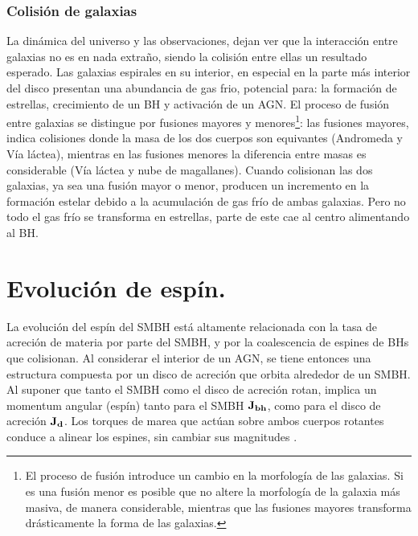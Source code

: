     \subsubsection{Colisión de galaxias}
    \label{subsubsec: mergers_galaxys}
La dinámica del universo y las observaciones, dejan ver que la interacción entre galaxias no es en nada extraño, siendo la colisión entre ellas un resultado esperado. Las galaxias espirales en su interior, en especial en la parte más interior del disco presentan una abundancia de gas frio, potencial para: la formación de estrellas, crecimiento de un BH y activación de un AGN. El proceso de fusión entre galaxias se distingue por fusiones mayores y menores\footnote{El proceso de fusión introduce un cambio en la morfología de las galaxias. Si es una fusión menor es posible que no altere la morfología de la galaxia más masiva, de manera considerable, mientras que las fusiones mayores transforma drásticamente la forma de las galaxias. }: las fusiones mayores, indica colisiones donde la masa de los dos cuerpos son equivantes (Andromeda y Vía láctea), mientras en las fusiones menores la diferencia entre masas es considerable (Vía láctea y nube de magallanes). Cuando colisionan las dos galaxias, ya sea una fusión mayor o menor, producen un incremento en la formación estelar debido a la acumulación de gas frío de ambas galaxias. Pero no todo el gas frío se transforma en estrellas, parte de este cae al centro alimentando al BH.

\section{Evolución de espín.}
\label{sec: Evolution_spin}

La evolución del espín del SMBH está altamente relacionada con la tasa de acreción de materia por parte del SMBH\cite{king2005}, y por la coalescencia de espines de BHs que colisionan\cite{dubois2014}. Al considerar el interior de un AGN, se tiene entonces una estructura compuesta por un disco de acreción que orbita alrededor de un SMBH. Al suponer que tanto el SMBH como el disco de acreción rotan, implica un momentum angular (espín) tanto para el SMBH $\bf{J}_{bh}$, como para el disco de acreción $\bf{J}_{d}$. Los torques de marea que actúan sobre ambos cuerpos rotantes conduce a alinear los espines, sin cambiar sus magnitudes \cite{king2005}.

